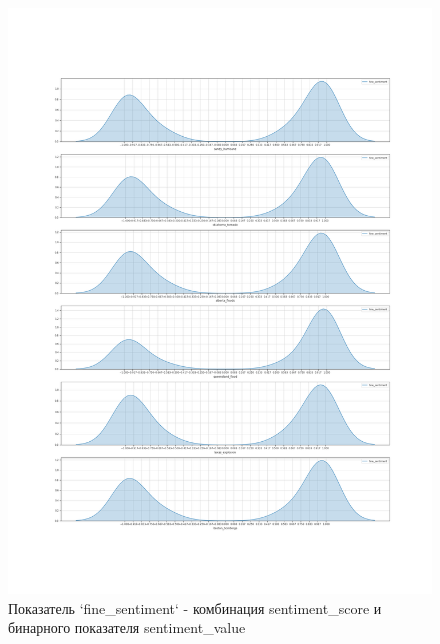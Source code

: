 \documentclass[11pt]{article}
\begin{document}
\begin{figure}
\centering
\includegraphics[width=\textwidth]{fine_sentiment.png}
\caption{Показатель `fine\_sentiment` - комбинация sentiment\_score и бинарного показателя sentiment\_value}\label{fine_sentiment}
\end{figure}
\end{document}
